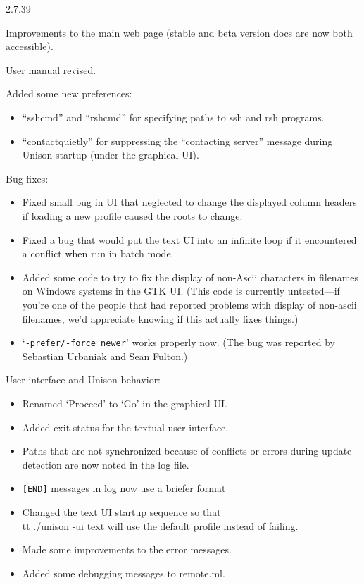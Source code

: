 \begin{changesfromversion}{2.7.39}
\item Improvements to the main web page (stable and beta version docs are
  now both accessible).
\item User manual revised.
\item Added some new preferences:
\begin{itemize}
\item ``sshcmd'' and ``rshcmd'' for specifying paths to ssh and rsh programs.
\item ``contactquietly'' for suppressing the ``contacting server'' message
during Unison startup (under the graphical UI).
\end{itemize}
\item Bug fixes:
\begin{itemize}
\item Fixed small bug in UI that neglected to change the displayed column 
  headers if loading a new profile caused the roots to change.
\item Fixed a bug that would put the text UI into an infinite loop if it
  encountered a conflict when run in batch mode.
\item Added some code to try to fix the display of non-Ascii characters in 
  filenames on Windows systems in the GTK UI.  (This code is currently 
  untested---if you're one of the people that had reported problems with
  display of non-ascii filenames, we'd appreciate knowing if this actually 
  fixes things.)
\item `\verb|-prefer/-force newer|' works properly now.  
        (The bug was reported by Sebastian Urbaniak and Sean Fulton.)
\end{itemize}
\item User interface and Unison behavior:
\begin{itemize}
\item Renamed `Proceed' to `Go' in the graphical UI.
\item Added exit status for the textual user interface.
\item Paths that are not synchronized because of conflicts or errors during 
  update detection are now noted in the log file.
\item \verb|[END]| messages in log now use a briefer format
\item Changed the text UI startup sequence so that
  {\\tt ./unison -ui text} will use the default profile instead of failing.
\item Made some improvements to the error messages.
\item Added some debugging messages to remote.ml.
\end{itemize}
\end{changesfromversion}

